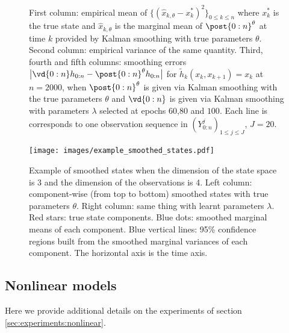 \documentclass{article}
\begin{document}
\begin{figure}
    \caption{First column: empirical mean of $\{(\hat{x}_{k, \theta} - x_k^{*})^2\}_{0 \leqslant k \leqslant n}$ where $x_k^{*}$ is the true state and $\hat{x}_{k, \theta}$ is the marginal mean of $\post{0:n}^\parvec$ at time $k$ provided by Kalman smoothing with true parameters $\theta$. Second column: empirical variance of the same quantity. Third, fourth and fifth columns: smoothing errors $\big| \vd{0:n} h_{0:n} -  \post{0:n}^{\parvec} h_{0:n} \big|$ for $\tilde{h}_{k}(x_k, x_{k+1}) = x_k$ at $n = 2000$, when $\post{0:n}^\parvec$ is given via Kalman smoothing with the true parameters $\theta$ and $\vd{0:n}$ is given via Kalman smoothing with parameters $\lambda$ selected at epochs $60$,$80$ and $100$. Each line is corresponds to one observation sequence in $(Y^j_{0:n})_{1\leq j \leq J}$, $J=20$.}
    \label{fig:table_linear_gaussian_appendix}
\end{figure}

\begin{figure}
  \centering
  \texttt{[image: images/example\_smoothed\_states.pdf]}
  \caption{Example of smoothed states when the dimension of the state space is 3 and the dimension of the observations is 4. Left column: component-wise (from top to bottom) smoothed states with true parameters $\theta$. Right column: same thing with learnt parameters $\lambda$. Red stars: true state components. Blue dots: smoothed marginal means of each component. Blue vertical lines: 95\% confidence regions built from the smoothed marginal variances of each component. The horizontal axis is the time axis.}
  \label{fig:smoothing_multidimensional}
\end{figure}%

\subsection{Nonlinear models}

Here we provide additional details on the experiments of section \ref{sec:experiments:nonlinear}. 
\end{document}
